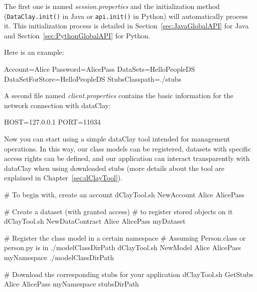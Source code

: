 The first one is named \textit{session.properties} and the initialization method (\texttt{DataClay.init()} in Java or \texttt{api.init()} in Python) will automatically process it. This initialization process is detailed in Section~\ref{sec:JavaGlobalAPI} for Java and Section~\ref{sec:PythonGlobalAPI} for Python.

Here is an example:

\begin{tBox}
\begin{bash}
Account=Alice
Password=AlicePass
DataSets=HelloPeopleDS
DataSetForStore=HelloPeopleDS
StubsClasspath=./stubs
\end{bash}
\end{tBox}

A second file named \textit{client.properties} contains the basic information for the network connection with dataClay:

\begin{tBox}
\begin{bash}
HOST=127.0.0.1
PORT=11034
\end{bash}
\end{tBox}

Now you can start using a simple dataClay tool intended for management operations. In this way, our class models can be registered, datasets with specific access rights can be defined, and our application can interact transparently with dataClay when using downloaded stubs (more details about the tool are explained in Chapter~\ref{sec:dClayTool}).

\begin{minipage}{\linewidth}
\begin{tBox}
\begin{bash}
 # To begin with, create an account
 dClayTool.sh NewAccount Alice AlicePass
 
 # Create a dataset (with granted access) 
 # to register stored objects on it
 dClayTool.sh NewDataContract Alice AlicePass myDataset
 
 # Register the class model in a certain namespace
 # Assuming Person.class or person.py is in ./modelClassDirPath
 dClayTool.sh NewModel Alice AlicePass myNamespace ./modelClassDirPath \
  <java | python>
 
 # Download the corresponding stubs for your application
 dClayTool.sh GetStubs Alice AlicePass myNamespace stubsDirPath
\end{bash}
\end{tBox}
\end{minipage}

